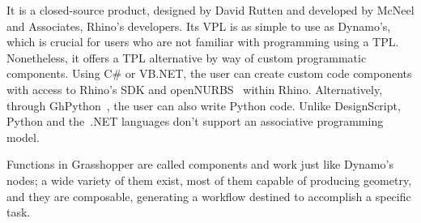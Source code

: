 It is a closed-source product, designed by David Rutten and developed by McNeel
and Associates, Rhino's developers.  Its \ac{VPL} is as simple to use as
Dynamo's, which is crucial for users who are not familiar with programming using
a \ac{TPL}.  Nonetheless, it offers a \ac{TPL} alternative by way of custom
programmatic components.  Using C\# or VB.NET, the user can create custom code
components with access to Rhino's \ac{SDK} and
openNURBS~\cite{Lear:2018:openNURBS} within Rhino.  Alternatively, through
GhPython~\cite{Giulio:2017:GhPython}, the user can also write Python code.
Unlike DesignScript, Python and the~.NET languages don't support an associative
programming model.

Functions in Grasshopper are called components and work just like Dynamo's
nodes; a wide variety of them exist, most of them capable of producing geometry,
and they are composable, generating a workflow destined to accomplish a specific
task.
